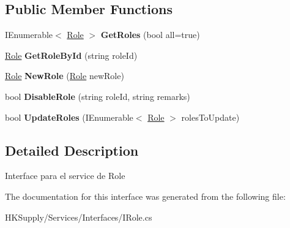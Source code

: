 \subsection*{Public Member Functions}
\begin{DoxyCompactItemize}
\item 
\mbox{\label{interface_h_k_supply_1_1_services_1_1_interfaces_1_1_i_role_a921bacd80020de3cf811705857c9eb7e}} 
I\+Enumerable$<$ \hyperlink{class_h_k_supply_1_1_models_1_1_role}{Role} $>$ {\bfseries Get\+Roles} (bool all=true)
\item 
\mbox{\label{interface_h_k_supply_1_1_services_1_1_interfaces_1_1_i_role_ad83423359435ae70026a1daac5bd07ae}} 
\hyperlink{class_h_k_supply_1_1_models_1_1_role}{Role} {\bfseries Get\+Role\+By\+Id} (string role\+Id)
\item 
\mbox{\label{interface_h_k_supply_1_1_services_1_1_interfaces_1_1_i_role_a7fea1e910bcd64d8e99da8bf4438e50f}} 
\hyperlink{class_h_k_supply_1_1_models_1_1_role}{Role} {\bfseries New\+Role} (\hyperlink{class_h_k_supply_1_1_models_1_1_role}{Role} new\+Role)
\item 
\mbox{\label{interface_h_k_supply_1_1_services_1_1_interfaces_1_1_i_role_a4f5e4bf501b1affbae4d3d39dbb837b5}} 
bool {\bfseries Disable\+Role} (string role\+Id, string remarks)
\item 
\mbox{\label{interface_h_k_supply_1_1_services_1_1_interfaces_1_1_i_role_a0960468c3fb4db4f09b3175106ee7753}} 
bool {\bfseries Update\+Roles} (I\+Enumerable$<$ \hyperlink{class_h_k_supply_1_1_models_1_1_role}{Role} $>$ roles\+To\+Update)
\end{DoxyCompactItemize}


\subsection{Detailed Description}
Interface para el service de Role 



The documentation for this interface was generated from the following file\+:\begin{DoxyCompactItemize}
\item 
H\+K\+Supply/\+Services/\+Interfaces/I\+Role.\+cs\end{DoxyCompactItemize}

